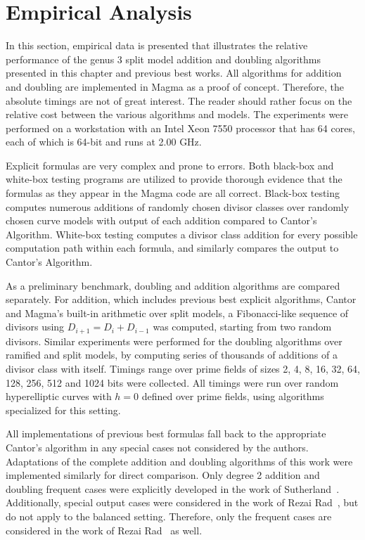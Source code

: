 \section{Empirical Analysis}
\label{sec:g3numerical}

In this section, empirical data is presented that illustrates the relative
performance of the genus 3 split model addition and doubling algorithms
presented in this chapter and previous best works. All algorithms for addition
and doubling are implemented in Magma as a proof of concept. Therefore, the
absolute timings are not of great interest. The reader should rather focus on
the relative cost between the various algorithms and models. The experiments
were performed on a workstation with an Intel Xeon 7550 processor that has 64
cores, each of which is 64-bit and runs at 2.00 GHz. 

Explicit formulas are very complex and prone to errors. Both black-box
and white-box testing programs are utilized to provide thorough evidence that
the formulas as they appear in the Magma code are all correct. Black-box testing
computes numerous additions of randomly chosen divisor classes over randomly
chosen curve models with output of each addition compared to Cantor's Algorithm.
White-box testing computes a divisor class addition for every possible
computation path within each formula, and similarly compares the output to
Cantor's Algorithm. 

As a preliminary benchmark, doubling and addition algorithms are compared
separately. For addition, which includes previous best explicit algorithms,
Cantor and Magma's built-in arithmetic over split models, a
Fibonacci-like sequence of divisors using $D_{i+1} = D_{i} + D_{i-1}$ was
computed, starting from two random divisors. Similar experiments were performed
for the doubling algorithms over ramified and split models, by computing series
of thousands of additions of a divisor class with itself. Timings range over
prime fields of sizes 2, 4, 8, 16, 32, 64, 128, 256, 512 and 1024 bits were
collected. All timings were run over random hyperelliptic curves with $h=0$
defined over prime fields, using algorithms specialized for this setting.

All implementations of previous best formulas fall back to the appropriate
Cantor's algorithm in any special cases not considered by the authors. Adaptations
of the complete addition and doubling algorithms of this work were implemented
similarly for direct comparison. Only degree 2 addition and doubling frequent
cases were explicitly developed in the work of
Sutherland~\cite{Sutherland_g3_2019}. Additionally, special output cases were
considered in the work of Rezai Rad~\cite{rad2019jacobian}, but do not apply to the
balanced setting. Therefore, only the frequent cases are considered in the work
of Rezai Rad~\cite{rad2019jacobian} as well.

